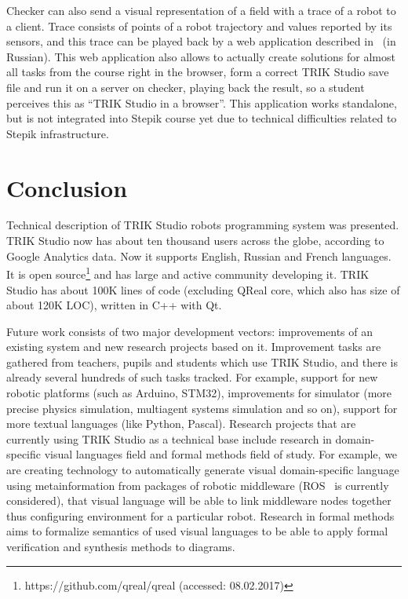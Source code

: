 \documentclass[conference]{IEEEtran}
\begin{document}
Checker can also send a visual representation of a field with a trace of a robot to a client. Trace consists of points of a robot trajectory and values reported by its sensors, and this trace can be played back by a web application described in~\cite{zakharov2016web} (in Russian). This web application also allows to actually create solutions for almost all tasks from the course right in the browser, form a correct TRIK Studio save file and run it on a server on checker, playing back the result, so a student perceives this as "`TRIK Studio in a browser"'. This application works standalone, but is not integrated into Stepik course yet due to technical difficulties related to Stepik infrastructure.

\section*{Conclusion}
\label{chapter:conclusion}

Technical description of TRIK Studio robots programming system was presented. TRIK Studio now has about ten thousand users across the globe, according to Google Analytics data. Now it supports English, Russian and French languages. It is open source\footnote{https://github.com/qreal/qreal (accessed: 08.02.2017)} and has large and active community developing it. TRIK Studio has about 100K lines of code (excluding QReal core, which also has size of about 120K LOC), written in C++ with Qt.

Future work consists of two major development vectors: improvements of an existing system and new research projects based on it. Improvement tasks are gathered from teachers, pupils and students which use TRIK Studio, and there is already several hundreds of such tasks tracked. For example, support for new robotic platforms (such as Arduino, STM32), improvements for simulator (more precise physics simulation, multiagent systems simulation and so on), support for more textual languages (like Python, Pascal). Research projects that are currently using TRIK Studio as a technical base include research in domain-specific visual languages field and formal methods field of study. For example, we are creating technology to automatically generate visual domain-specific language using metainformation from packages of robotic middleware (ROS~\cite{quigley2009ros} is currently considered), that visual language will be able to link middleware nodes together thus configuring environment for a particular robot. Research in formal methods aims to formalize semantics of used visual languages to be able to apply formal verification and synthesis methods to diagrams.



\end{document}
